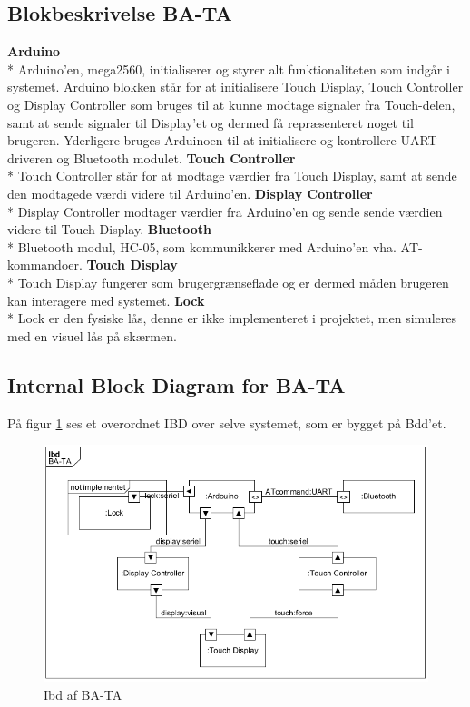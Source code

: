 \subsection{Blokbeskrivelse BA-TA}
\textbf{Arduino} \\*
Arduino'en, mega2560, initialiserer og styrer alt funktionaliteten som indgår i systemet. Arduino blokken står for at initialisere  Touch Display, Touch Controller og Display Controller som bruges til at kunne modtage signaler fra Touch-delen, samt at sende signaler til Display'et og dermed få repræsenteret noget til brugeren. Yderligere bruges Arduinoen til at initialisere og kontrollere UART driveren og Bluetooth modulet.
\newline
\newline
\textbf{Touch Controller} \\*
Touch Controller står for at modtage værdier fra Touch Display, samt at sende den modtagede værdi videre til Arduino'en. 
\newline
\newline
\textbf{Display Controller} \\*
Display Controller modtager værdier fra Arduino'en og sende sende værdien videre til Touch Display. \newline
\newline
\textbf{Bluetooth} \\*
Bluetooth modul, HC-05, som kommunikkerer med Arduino'en vha. AT-kommandoer.
\newline
\newline
\textbf{Touch Display} \\*
Touch Display fungerer som brugergrænseflade og er dermed måden brugeren kan interagere med systemet. 
\newline
\newline
\textbf{Lock} \\*
Lock er den fysiske lås, denne er ikke implementeret i projektet, men simuleres med en visuel lås på skærmen. 
\subsection{Internal Block Diagram for BA-TA}
På figur \ref{fig:Ibd} ses et overordnet IBD over selve systemet, som er bygget på Bdd'et. 
\begin{figure}[H]
	\centering
	\includegraphics[width = 300 pt]{Img/Ibd.png}
	\caption{Ibd af BA-TA}
	\label{fig:Ibd}
\end{figure}




